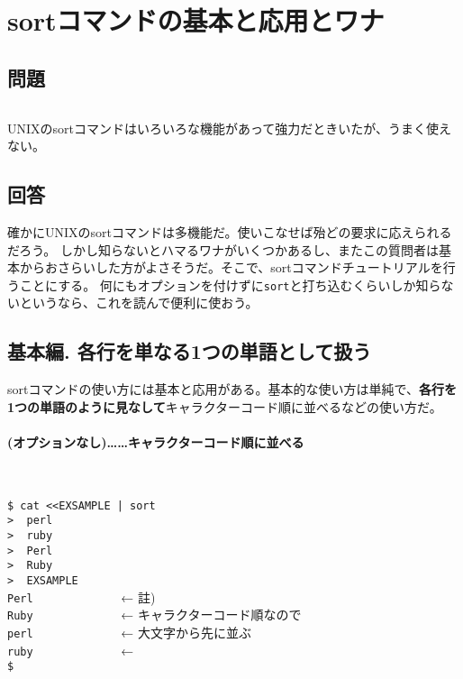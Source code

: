 \section{sortコマンドの基本と応用とワナ}
\label{recipe:sort}

\subsection*{問題}
\noindent
$\!\!\!\!\!$
\begin{grshfboxit}{160.0mm}
	UNIXのsortコマンドはいろいろな機能があって強力だときいたが、うまく使えない。
\end{grshfboxit}

\subsection*{回答}

確かにUNIXのsortコマンドは多機能だ。使いこなせば殆どの要求に応えられるだろう。
しかし知らないとハマるワナがいくつかあるし、またこの質問者は基本からおさらいした方がよさそうだ。そこで、sortコマンドチュートリアルを行うことにする。
何にもオプションを付けずに\verb|sort|と打ち込むくらいしか知らないというなら、これを読んで便利に使おう。

\subsection*{基本編. 各行を単なる1つの単語として扱う}

sortコマンドの使い方には基本と応用がある。基本的な使い方は単純で、\textbf{各行を1つの単語のように見なして}キャラクターコード順に並べるなどの使い方だ。

\paragraph*{(オプションなし)……キャラクターコード順に並べる}　\\
\begin{screen}
	\verb!$ cat <<EXSAMPLE | sort! \return \\
	\verb!>  perl! \return \\
	\verb!>  ruby! \return \\
	\verb!>  Perl! \return \\
	\verb!>  Ruby! \return \\
	\verb!>  EXSAMPLE! \return \\
	\verb!Perl             !  ← 註) \\
	\verb!Ruby             !  ← キャラクターコード順なので \\
	\verb!perl             !  ← 大文字から先に並ぶ \\
	\verb!ruby             !  ← \\
	\verb!$ !
\end{screen}

